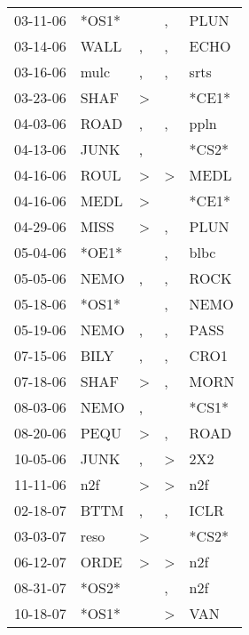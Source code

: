 \begin{supertabular}{lllll}
 03-11-06 &  *OS1* &                  &                , &   PLUN \\
 03-14-06 &   WALL &                , &                , &   ECHO \\
 03-16-06 &   mulc &                , &                , &   srts \\
 03-23-06 &   SHAF &     \textgreater &                  &  *CE1* \\
 04-03-06 &   ROAD &                , &                , &   ppln \\
 04-13-06 &   JUNK &                , &                  &  *CS2* \\
 04-16-06 &   ROUL &     \textgreater &     \textgreater &   MEDL \\
 04-16-06 &   MEDL &     \textgreater &                  &  *CE1* \\
 04-29-06 &   MISS &     \textgreater &                , &   PLUN \\
 05-04-06 &  *OE1* &                  &                , &   blbc \\
 05-05-06 &   NEMO &                , &                , &   ROCK \\
 05-18-06 &  *OS1* &                  &                , &   NEMO \\
 05-19-06 &   NEMO &                , &                , &   PASS \\
 07-15-06 &   BILY &                , &                , &   CRO1 \\
 07-18-06 &   SHAF &     \textgreater &                , &   MORN \\
 08-03-06 &   NEMO &                , &                  &  *CS1* \\
 08-20-06 &   PEQU &     \textgreater &                , &   ROAD \\
 10-05-06 &   JUNK &                , &     \textgreater &    2X2 \\
 11-11-06 &    n2f &     \textgreater &     \textgreater &    n2f \\
 02-18-07 &   BTTM &                , &                , &   ICLR \\
 03-03-07 &   reso &     \textgreater &                  &  *CS2* \\
 06-12-07 &   ORDE &     \textgreater &     \textgreater &    n2f \\
 08-31-07 &  *OS2* &                  &                , &    n2f \\
 10-18-07 &  *OS1* &                  &     \textgreater &    VAN \\

\end{supertabular}
